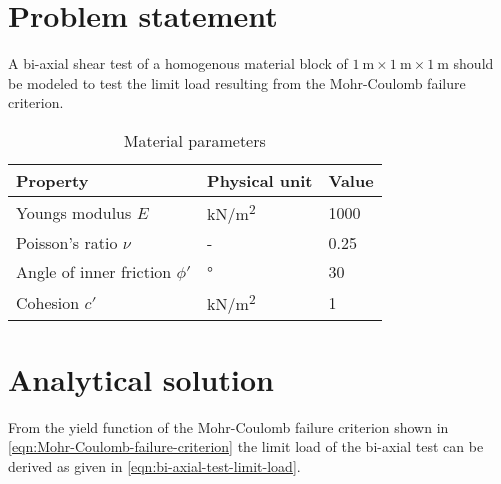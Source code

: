 \section{Problem statement}

A bi-axial shear test of a homogenous material block of $\SI{1}{\metre} \times
    \SI{1}{\metre} \times \SI{1}{\metre}$ should be modeled to test the limit load
resulting from the Mohr-Coulomb failure criterion.

\begin{table}[htbp]
    \centering
    \caption{Material parameters}
    \label{bi-axial-shear-mohr-coulomb:material-parameters}
    \begin{tabularx}{\textwidth}{XYY}

        \hline

        Property                        & Physical unit                                         & Value       \\

        \hline

        Youngs modulus $E$              & \si[per-mode = symbol]{\kilo\newton\per\square\metre} &
        \SI{1000}{}                                                                                           \\

        Poisson's ratio $\nu$           & -                                                     & \SI{0.25}{} \\

        Angle of inner friction $\phi'$ & \si[per-mode = symbol]{\degree}                       & \SI{30}{}
        \\

        Cohesion $c'$                   & \si[per-mode = symbol]{\kilo\newton\per\square\metre} & 1           \\

        \hline
    \end{tabularx}
\end{table}

\section{Analytical solution}

From the yield function of the Mohr-Coulomb failure criterion shown in
\autoref{eqn:Mohr-Coulomb-failure-criterion} the limit load of the bi-axial
test can be derived as given in \autoref{eqn:bi-axial-test-limit-load}.

